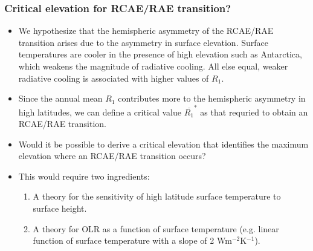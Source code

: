 \documentclass{ametsocV5}
\begin{document}
        \subsubsection{Critical elevation for RCAE/RAE transition?}
        \begin{itemize}
          \item We hypothesize that the hemispheric asymmetry of the RCAE/RAE transition arises due to the asymmetry in surface elevation. Surface temperatures are cooler in the presence of high elevation such as Antarctica, which weakens the magnitude of radiative cooling. All else equal, weaker radiative cooling is associated with higher values of $R_{1}$.
          \item Since the annual mean $R_{1}$ contributes more to the hemispheric asymmetry in high latitudes, we can define a critical value $\overline{R_{1}}^{*}$ as that requried to obtain an RCAE/RAE transition.
          \item Would it be possible to derive a critical elevation that identifies the maximum elevation where an RCAE/RAE transition occurs?
          \item This would require two ingredients:
                \begin{enumerate}
                  \item A theory for the sensitivity of high latitude surface temperature to surface height.
                  \item A theory for OLR as a function of surface temperature (e.g. linear function of surface temperature with a slope of 2 Wm$^{-2}$K$^{-1}$).
                \end{enumerate}
        \end{itemize}
\end{document}
